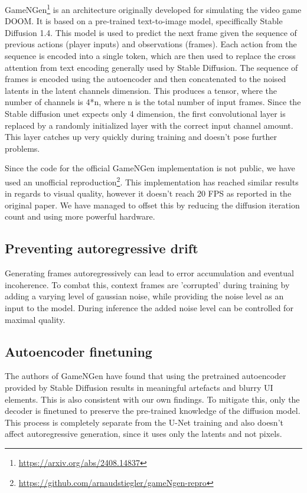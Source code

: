 \documentclass[twocolumn,a4paper]{article}
\begin{document}
GameNGen\footnote{\url{https://arxiv.org/abs/2408.14837}} is an architecture originally developed for simulating the video game DOOM. It is based on a pre-trained text-to-image model, speciffically Stable Diffusion 1.4. This model is used to predict the next frame given the sequence of previous actions (player inputs) and observations (frames). Each action from the sequence is encoded into a single token, which are then used to replace the cross attention from text encoding generally used by Stable Diffusion. The sequence of frames is encoded using the autoencoder and then concatenated to the noised latents in the latent channels dimension. This produces a tensor, where the number of channels is 4*n, where n is the total number of input frames. Since the Stable diffusion unet expects only 4 dimension, the first convolutional layer is replaced by a randomly initialized layer with the correct input channel amount. This layer catches up very quickly during training and doesn't pose further problems.

Since the code for the official GameNGen implementation is not public, we have used an unofficial reproduction\footnote{\url{https://github.com/arnaudstiegler/gameNgen-repro}}. This implementation has reached similar results in regards to visual quality, however it doesn't reach 20 FPS as reported in the original paper. We have managed to offset this by reducing the diffusion iteration count and using more powerful hardware.

\subsection{Preventing autoregressive drift}
Generating frames autoregressively can lead to error accumulation and eventual incoherence. To combat this, context frames are 'corrupted' during training by adding a varying level of gaussian noise, while providing the noise level as an input to the model. During inference the added noise level can be controlled for maximal quality.

\subsection{Autoencoder finetuning}
The authors of GameNGen have found that using the pretrained autoencoder provided by Stable Diffusion results in meaningful artefacts and blurry UI elements. This is also consistent with our own findings. To mitigate this, only the decoder is finetuned to preserve the pre-trained knowledge of the diffusion model. This process is completely separate from the U-Net training and also doesn't affect autoregressive generation, since it uses only the latents and not pixels.
\end{document}
